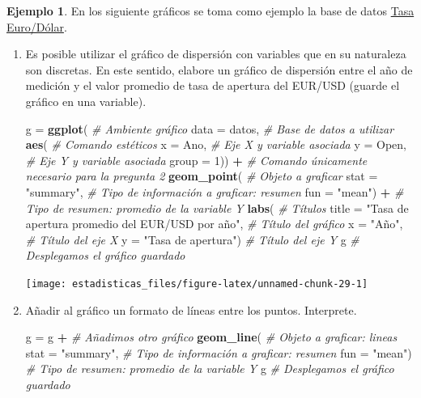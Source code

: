 \documentclass[
  11pt,
]{book}
\newenvironment{Shaded}{\begin{snugshade}}{\end{snugshade}}
\newcommand{\AttributeTok}[1]{\textcolor[rgb]{0.13,0.29,0.53}{#1}}
\newcommand{\CommentTok}[1]{\textcolor[rgb]{0.56,0.35,0.01}{\textit{#1}}}
\newcommand{\DecValTok}[1]{\textcolor[rgb]{0.00,0.00,0.81}{#1}}
\newcommand{\FunctionTok}[1]{\textcolor[rgb]{0.13,0.29,0.53}{\textbf{#1}}}
\newcommand{\NormalTok}[1]{#1}
\newcommand{\OtherTok}[1]{\textcolor[rgb]{0.56,0.35,0.01}{#1}}
\newcommand{\SpecialCharTok}[1]{\textcolor[rgb]{0.81,0.36,0.00}{\textbf{#1}}}
\newcommand{\StringTok}[1]{\textcolor[rgb]{0.31,0.60,0.02}{#1}}
\theoremstyle{definition}
\theoremstyle{definition}
\newtheorem{example}{Ejemplo}[chapter]
\theoremstyle{definition}
\theoremstyle{definition}
\theoremstyle{remark}
\begin{document}
\begin{example}

En los siguiente gráficos se toma como ejemplo la base de datos \hyperref[TasaEURUSD]{Tasa Euro/Dólar}.

\begin{enumerate}
\def\labelenumi{\arabic{enumi}.}
\item
  Es posible utilizar el gráfico de dispersión con variables que en su naturaleza son discretas. En este sentido, elabore un gráfico de dispersión entre el año de medición y el valor promedio de tasa de apertura del EUR/USD (guarde el gráfico en una variable).

\begin{Shaded}
\begin{Highlighting}[]
\NormalTok{g }\OtherTok{=} \FunctionTok{ggplot}\NormalTok{( }\CommentTok{\# Ambiente gráfico}
  \AttributeTok{data =}\NormalTok{ datos, }\CommentTok{\# Base de datos a utilizar}
  \FunctionTok{aes}\NormalTok{( }\CommentTok{\# Comando estéticos}
\AttributeTok{x =}\NormalTok{ Ano, }\CommentTok{\# Eje X y variable asociada}
\AttributeTok{y =}\NormalTok{ Open, }\CommentTok{\# Eje Y y variable asociada}
\AttributeTok{group =} \DecValTok{1}\NormalTok{)) }\SpecialCharTok{+} \CommentTok{\# Comando únicamente necesario para la pregunta 2}
  \FunctionTok{geom\_point}\NormalTok{( }\CommentTok{\# Objeto a graficar}
\AttributeTok{stat =} \StringTok{"summary"}\NormalTok{, }\CommentTok{\# Tipo de información a graficar: resumen}
\AttributeTok{fun =} \StringTok{"mean"}\NormalTok{) }\SpecialCharTok{+} \CommentTok{\# Tipo de resumen: promedio de la variable Y}
  \FunctionTok{labs}\NormalTok{( }\CommentTok{\# Títulos}
\AttributeTok{title =} \StringTok{"Tasa de apertura promedio del EUR/USD por año"}\NormalTok{, }\CommentTok{\# Título del gráfico}
\AttributeTok{x =} \StringTok{"Año"}\NormalTok{, }\CommentTok{\# Título del eje X}
\AttributeTok{y =} \StringTok{"Tasa de apertura"}\NormalTok{) }\CommentTok{\# Título del eje Y}
\NormalTok{g }\CommentTok{\# Desplegamos el gráfico guardado}
\end{Highlighting}
\end{Shaded}

  \begin{center}\texttt{[image: estadisticas\_files/figure-latex/unnamed-chunk-29-1]} \end{center}
\item
  Añadir al gráfico un formato de líneas entre los puntos. Interprete.

\begin{Shaded}
\begin{Highlighting}[]
\NormalTok{g }\OtherTok{=}\NormalTok{ g }\SpecialCharTok{+} \CommentTok{\# Añadimos otro gráfico}
  \FunctionTok{geom\_line}\NormalTok{( }\CommentTok{\# Objeto a graficar: lineas}
\AttributeTok{stat =} \StringTok{"summary"}\NormalTok{, }\CommentTok{\# Tipo de información a graficar: resumen}
\AttributeTok{fun =} \StringTok{"mean"}\NormalTok{) }\CommentTok{\# Tipo de resumen: promedio de la variable Y}
\NormalTok{g }\CommentTok{\# Desplegamos el gráfico guardado}
\end{Highlighting}
\end{Shaded}


\end{enumerate}
\end{example}
\end{document}
